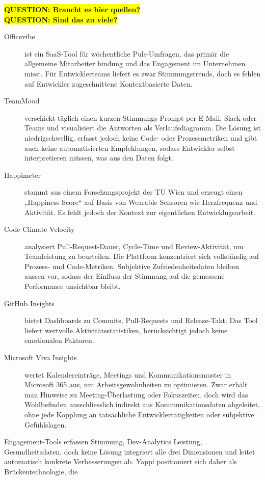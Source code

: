 \documentclass[12pt,a4paper]{report}
\newcommand{\question}[1]{\colorbox{yellow}{\textbf{QUESTION: #1}}\\}
\begin{document}
\question{Braucht es hier quellen?}
\question{Sind das zu viele?}
\begin{description}
  \item[Officevibe] ist ein SaaS-Tool für wöchentliche Puls-Umfragen, das primär die allgemeine Mitarbeiter­
        bindung und das Engagement im Unternehmen misst. Für Entwicklerteams liefert es zwar Stimmungs­trends,
        doch es fehlen auf Entwickler zugeschnittene Kontextbasierte Daten.

  \item[TeamMood] verschickt täglich einen kurzen Stimmungs-Prompt per E-Mail, Slack oder Teams und visualisiert
        die Antworten als Verlaufsdiagramm. Die Lösung ist niedrigschwellig, erfasst jedoch keine Code- oder
        Prozessmetriken und gibt auch keine automatisierten Empfehlungen, sodass Entwickler selbst interpretieren
        müssen, was aus den Daten folgt.

  \item[Happimeter] stammt aus einem Forschungsprojekt der TU Wien und erzeugt einen „Happiness-Score“ auf Basis
        von Wearable-Sensoren wie Herzfrequenz und Aktivität. Es fehlt jedoch der Kontext zur eigentlichen
        Entwicklugsarbeit.

  \item[Code Climate Velocity] analysiert Pull-Request-Dauer, Cycle-Time und Review-Aktivität, um Teamleistung zu
        beurteilen. Die Plattform konzentriert sich vollständig auf Prozess- und Code-Metriken. Subjektive
        Zufriedenheitsdaten bleiben aussen vor, sodass der Einfluss der Stimmung auf die gemessene Performance
        unsichtbar bleibt.

  \item[GitHub Insights] bietet Dashboards zu Commits, Pull-Requests und Release-Takt. Das Tool liefert wertvolle
        Aktivitäts­statistiken, berücksichtigt jedoch keine emotionalen Faktoren.

  \item[Microsoft Viva Insights] wertet Kalendereinträge, Meetings und Kommunikationsmuster in Microsoft 365 aus,
        um Arbeitsgewohnheiten zu optimieren. Zwar erhält man Hinweise zu Meeting-Überlastung oder Fokuszeiten,
        doch wird das Wohlbefinden ausschliesslich indirekt aus Kommunikationsdaten abgeleitet, ohne jede Kopplung
        an tatsächliche Entwickler­tätigkeiten oder subjektive Gefühlslagen.
\end{description}

Engagement-Tools erfassen Stimmung, Dev-Analytics Leistung, Gesundheitsdaten, doch keine Lösung integriert alle drei
Dimensionen und leitet automatisch konkrete Verbesserungen ab. Yappi positioniert sich daher als Brückentechnologie, die
\end{document}
